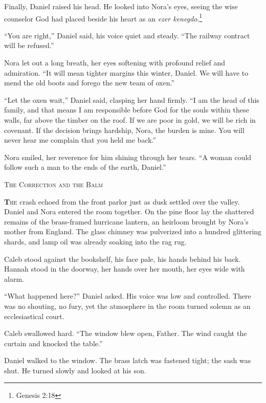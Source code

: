 \documentclass[11pt]{article}
\begin{document}
Finally, Daniel raised his head. He looked into Nora's eyes, seeing the wise counselor God had placed beside his heart as an \textit{ezer kenegdo}.\footnote{Genesis 2:18}

``You are right,'' Daniel said, his voice quiet and steady. ``The railway contract will be refused.''

Nora let out a long breath, her eyes softening with profound relief and admiration. ``It will mean tighter margins this winter, Daniel. We will have to mend the old boots and forego the new team of oxen.''

``Let the oxen wait,'' Daniel said, clasping her hand firmly. ``I am the head of this family, and that means I am responsible before God for the souls within these walls, far above the timber on the roof. If we are poor in gold, we will be rich in covenant. If the decision brings hardship, Nora, the burden is mine. You will never hear me complain that you held me back.''

Nora smiled, her reverence for him shining through her tears. ``A woman could follow such a man to the ends of the earth, Daniel.''

\newpage

\begin{center}
    {\scshape\large The Correction and the Balm}\par
    \vspace{0.2in}
\end{center}

\lettrine[lines=3,findent=1pt,nindent=0pt]{\textbf{T}}{he} crash echoed from the front parlor just as dusk settled over the valley. Daniel and Nora entered the room together. On the pine floor lay the shattered remains of the brass-framed hurricane lantern, an heirloom brought by Nora's mother from England. The glass chimney was pulverized into a hundred glittering shards, and lamp oil was already soaking into the rag rug.

Caleb stood against the bookshelf, his face pale, his hands behind his back. Hannah stood in the doorway, her hands over her mouth, her eyes wide with alarm.

``What happened here?'' Daniel asked. His voice was low and controlled. There was no shouting, no fury, yet the atmosphere in the room turned solemn as an ecclesiastical court.

Caleb swallowed hard. ``The window blew open, Father. The wind caught the curtain and knocked the table.''

Daniel walked to the window. The brass latch was fastened tight; the sash was shut. He turned slowly and looked at his son.
\end{document}
